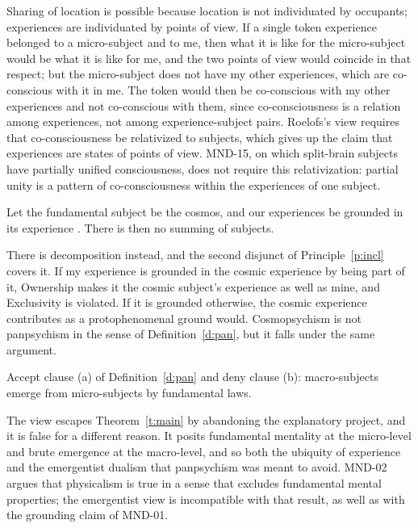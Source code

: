 \documentclass{situationist-preprint}
\begin{document}
\begin{reply}
Sharing of location is possible because location is not individuated by occupants; experiences are individuated by points of view. If a single token experience belonged to a micro-subject and to me, then what it is like for the micro-subject would be what it is like for me, and the two points of view would coincide in that respect; but the micro-subject does not have my other experiences, which are co-conscious with it in me. The token would then be co-conscious with my other experiences and not co-conscious with them, since co-consciousness is a relation among experiences, not among experience-subject pairs. Roelofs's view requires that co-consciousness be relativized to subjects, which gives up the claim that experiences are states of points of view. MND-15, on which split-brain subjects have partially unified consciousness, does not require this relativization: partial unity is a pattern of co-consciousness within the experiences of one subject.
\end{reply}

\begin{objection}[Cosmopsychism]
Let the fundamental subject be the cosmos, and our experiences be grounded in its experience \citep{NagasawaWager2016}. There is then no summing of subjects.
\end{objection}

\begin{reply}
There is decomposition instead, and the second disjunct of Principle~\ref{p:incl} covers it. If my experience is grounded in the cosmic experience by being part of it, Ownership makes it the cosmic subject's experience as well as mine, and Exclusivity is violated. If it is grounded otherwise, the cosmic experience contributes as a protophenomenal ground would. Cosmopsychism is not panpsychism in the sense of Definition~\ref{d:pan}, but it falls under the same argument.
\end{reply}

\begin{objection}
Accept clause (a) of Definition~\ref{d:pan} and deny clause (b): macro-subjects emerge from micro-subjects by fundamental laws.
\end{objection}

\begin{reply}
The view escapes Theorem~\ref{t:main} by abandoning the explanatory project, and it is false for a different reason. It posits fundamental mentality at the micro-level and brute emergence at the macro-level, and so both the ubiquity of experience and the emergentist dualism that panpsychism was meant to avoid. MND-02 argues that physicalism is true in a sense that excludes fundamental mental properties; the emergentist view is incompatible with that result, as well as with the grounding claim of MND-01.
\end{reply}
\end{document}
